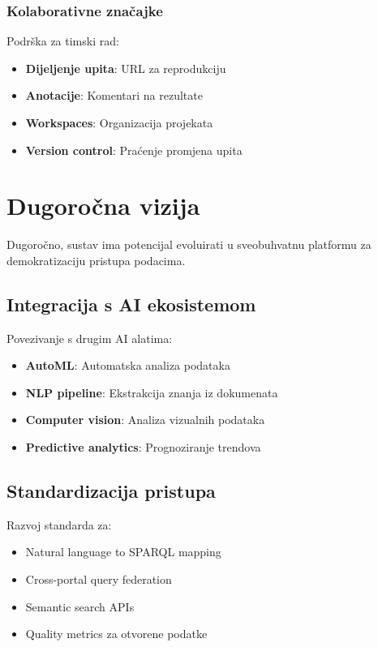 \subsubsection{Kolaborativne značajke}

Podrška za timski rad:

\begin{itemize}
    \item \textbf{Dijeljenje upita}: URL za reprodukciju
    \item \textbf{Anotacije}: Komentari na rezultate
    \item \textbf{Workspaces}: Organizacija projekata
    \item \textbf{Version control}: Praćenje promjena upita
\end{itemize}

\section{Dugoročna vizija}

Dugoročno, sustav ima potencijal evoluirati u sveobuhvatnu platformu za demokratizaciju pristupa podacima.

\subsection{Integracija s AI ekosistemom}

Povezivanje s drugim AI alatima:

\begin{itemize}
    \item \textbf{AutoML}: Automatska analiza podataka
    \item \textbf{NLP pipeline}: Ekstrakcija znanja iz dokumenata
    \item \textbf{Computer vision}: Analiza vizualnih podataka
    \item \textbf{Predictive analytics}: Prognoziranje trendova
\end{itemize}

\subsection{Standardizacija pristupa}

Razvoj standarda za:

\begin{itemize}
    \item Natural language to SPARQL mapping
    \item Cross-portal query federation
    \item Semantic search APIs
    \item Quality metrics za otvorene podatke
\end{itemize}

